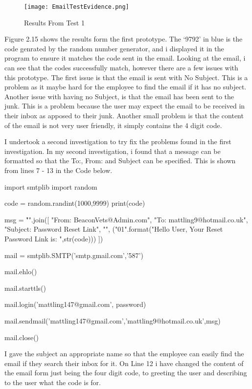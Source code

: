 \begin{figure}[H]
\caption{Results From Test 1} \label{fig:Results From Test 1}
\hfill\texttt{[image: EmailTestEvidence.png]}\hspace*{\fill}
\end{figure}


Figure 2.15 shows the results form the first prototype. The `9792' in blue is the code genrated by the random number generator, and i displayed it in the program to ensure it matches the code sent in the email. Looking at the email, i can see that the codes successfully match, however there are a few issues with this prototype. The first issue is that the email is sent with No Subject. This is a problem as it maybe hard for the employee to find the email if it has no subject. Another issue with having no Subject, is that the email has been sent to the junk. This is a problem because the user may expect the email to be received in their inbox as apposed to their junk. Another small problem is that the content of the email is not very user friendly, it simply contains the 4 digit code. \par

\pagebreak

I undertook a second investigation to try fix the problems found in the first investigation. In my second investigation, i found that a message can be formatted so that the To:, From: and Subject can be specified. This is shown from lines 7 - 13 in the Code below.

\begin{python}
import smtplib
import random

code = random.randint(1000,9999)
print(code)

msg = "\r\n".join([
  "From: BeaconVets@Admin.com",
  "To: mattling9@hotmail.co.uk",
  "Subject: Password Reset Link",
  "",
  ("{0}{1}".format("Hello User, \n \n Your Reset Password Link is:  ",str(code)))
  ])

mail = smtplib.SMTP('smtp.gmail.com','587')

mail.ehlo()

mail.starttls()

mail.login('mattling147@gmail.com', password)

mail.sendmail('mattling147@gmail.com','mattling9@hotmail.co.uk',msg)

mail.close()

\end{python}

I gave the subject an appropriate name so that the employee can easily find the email if they search their inbox for it. On Line 12 i have changed the content of the email form just being the four digit code, to greeting the user and describing to the user what the code is for. \par

